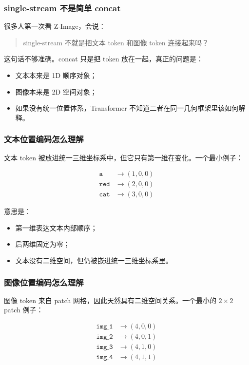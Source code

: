\subsubsection{single-stream 不是简单 concat}

很多人第一次看 Z-Image，会说：

\begin{quote}
single-stream 不就是把文本 token 和图像 token 连接起来吗？
\end{quote}

这句话不够准确。concat 只是把 token 放在一起，真正的问题是：

\begin{itemize}[leftmargin=1.5em]
  \item 文本本来是 1D 顺序对象；
  \item 图像本来是 2D 空间对象；
  \item 如果没有统一位置体系，Transformer 不知道二者在同一几何框架里该如何解释。
\end{itemize}

\subsubsection{文本位置编码怎么理解}

文本 token 被放进统一三维坐标系中，但它只有第一维在变化。一个最小例子：

\begin{align*}
\texttt{a}   &\rightarrow (1,0,0) \\
\texttt{red} &\rightarrow (2,0,0) \\
\texttt{cat} &\rightarrow (3,0,0)
\end{align*}

意思是：

\begin{itemize}[leftmargin=1.5em]
  \item 第一维表达文本内部顺序；
  \item 后两维固定为零；
  \item 文本没有二维空间，但仍被嵌进统一三维坐标系里。
\end{itemize}

\subsubsection{图像位置编码怎么理解}

图像 token 来自 patch 网格，因此天然具有二维空间关系。一个最小的 $2 \times 2$ patch 例子：

\begin{align*}
\texttt{img\_1} &\rightarrow (4,0,0) \\
\texttt{img\_2} &\rightarrow (4,0,1) \\
\texttt{img\_3} &\rightarrow (4,1,0) \\
\texttt{img\_4} &\rightarrow (4,1,1)
\end{align*}

